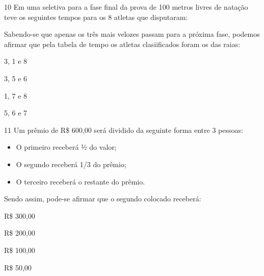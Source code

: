 \num{10} Em uma seletiva para a fase final da prova de 100 metros livres de
natação teve os seguintes tempos para os 8 atletas que disputaram:


Sabendo-se que apenas os três mais velozes passam para a próxima fase,
podemos afirmar que pela tabela de tempo os atletas clasiificados foram
os das raias:

\begin{escolha}
\item
  3, 1 e 8
\item
  3, 5 e 6
\item
  1, 7 e 8
\item
  5, 6 e 7
\end{escolha}


\num{11} Um prêmio de R\$ 600,00 será dividido da seguinte forma entre 3
pessoas:

\begin{itemize}
\item
  O primeiro receberá ½ do valor;
\item
  O segundo receberá 1/3 do prêmio;
\item
  O terceiro receberá o restante do prêmio.
\end{itemize}

Sendo assim, pode-se afirmar que o segundo colocado receberá:

\begin{escolha}
\item
  R\$ 300,00
\item
  R\$ 200,00
\item
  R\$ 100,00
\item
  R\$ 50,00
\end{escolha}


